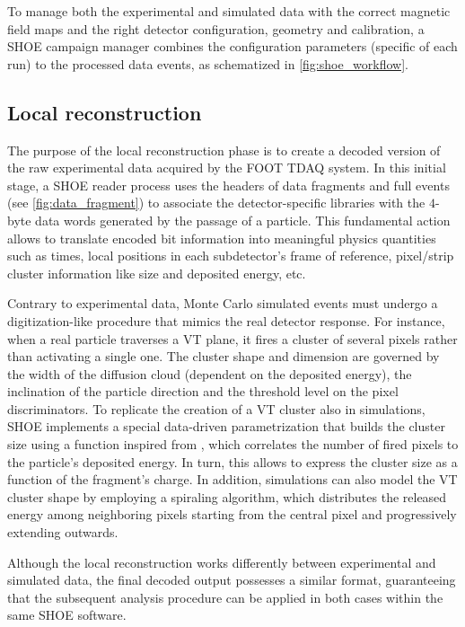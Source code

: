 To manage both the experimental and simulated data with the correct magnetic field maps and the right detector configuration, geometry and calibration, a SHOE campaign manager combines the configuration parameters (specific of each run) to the processed data events, as schematized in \autoref{fig:shoe_workflow}.
\subsection{Local reconstruction}\label{ssec:local_reconstruction}
The purpose of the local reconstruction phase is to create a decoded version of the raw experimental data acquired by the FOOT TDAQ system. In this initial stage, a SHOE reader process uses the headers of data fragments and full events (see \autoref{fig:data_fragment}) to associate the detector-specific libraries with the $4$-byte data words generated by the passage of a particle. This fundamental action allows to translate encoded bit information into meaningful physics quantities such as times, local positions in each subdetector's frame of reference, pixel/strip cluster information like size and deposited energy, etc.

Contrary to experimental data, Monte Carlo simulated events must undergo a digitization-like procedure that mimics the real detector response. For instance, when a real particle traverses a VT plane, it fires a cluster of several pixels rather than activating a single one. The cluster shape and dimension are governed by the width of the diffusion cloud (dependent on the deposited energy), the inclination of the particle direction and the threshold level on the pixel discriminators. To replicate the creation of a VT cluster also in simulations, SHOE implements a special data-driven parametrization that builds the cluster size using a function inspired from \cite{REIDEL2021165807}, which correlates the number of fired pixels to the particle's deposited energy. In turn, this allows to express the cluster size as a function of the fragment's charge. In addition, simulations can also model the VT cluster shape by employing a spiraling algorithm, which distributes the released energy among neighboring pixels starting from the central pixel and progressively extending outwards.

Although the local reconstruction works differently between experimental and simulated data, the final decoded output possesses a similar format, guaranteeing that the subsequent analysis procedure can be applied in both cases within the same SHOE software.

